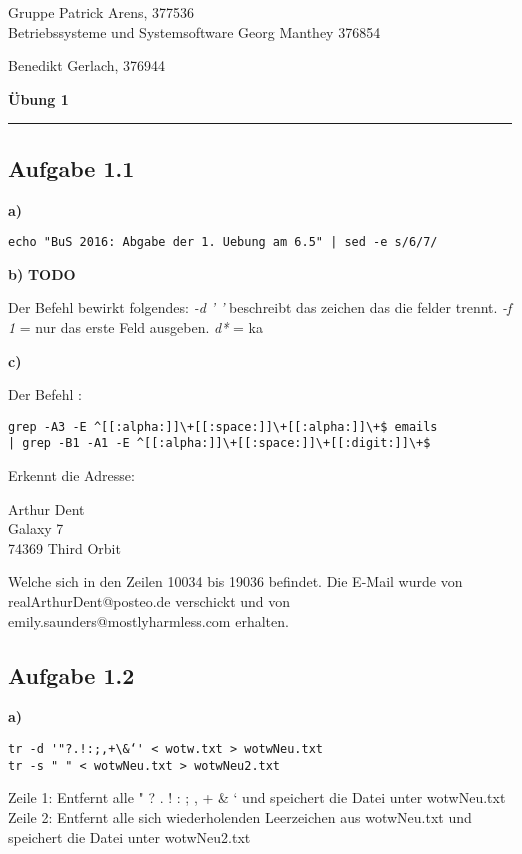 \documentclass[a4paper,graphics,11pt]{article}
\newcommand{\aufgabe}[1]{\subsection*{Aufgabe #1}}
\begin{document}
\noindent Gruppe              \hfill Patrick Arens, 377536\\
\noindent Betriebssysteme und Systemsoftware    \hfill Georg Manthey 376854\\
\strut\hfill Benedikt Gerlach, 376944\\
\begin{center}
	\LARGE{\textbf{Übung 1}}
\end{center}
\begin{center}
\rule[0.1ex]{\textwidth}{1pt}
\end{center}

\aufgabe{1.1}
\textbf{a)}

\begin{verbatim}
echo "BuS 2016: Abgabe der 1. Uebung am 6.5" | sed -e s/6/7/
\end{verbatim}

\textbf{b)}
\textbf{TODO}

Der Befehl bewirkt folgendes: \textit{-d ’ ’} beschreibt das zeichen das die felder trennt. \textit{-f 1} = nur das erste Feld ausgeben. \textit{d*} = ka

\textbf{c)}

Der Befehl :

\begin{verbatim}
grep -A3 -E ^[[:alpha:]]\+[[:space:]]\+[[:alpha:]]\+$ emails 
| grep -B1 -A1 -E ^[[:alpha:]]\+[[:space:]]\+[[:digit:]]\+$
\end{verbatim}



Erkennt die Adresse:

Arthur Dent\\
Galaxy 7\\
74369 Third Orbit

Welche sich in den Zeilen 10034 bis 19036 befindet. Die E-Mail wurde von realArthurDent@posteo.de verschickt und von emily.saunders@mostlyharmless.com erhalten.\\

\aufgabe{1.2}
\textbf{a)}

\begin{verbatim}
tr -d '"?.!:;,+\&‘' < wotw.txt > wotwNeu.txt
tr -s " " < wotwNeu.txt > wotwNeu2.txt
\end{verbatim}

Zeile 1: Entfernt alle " ? . ! : ; , +  \& ‘  und speichert die Datei unter wotwNeu.txt\\
Zeile 2: Entfernt alle sich wiederholenden Leerzeichen aus wotwNeu.txt und speichert die Datei unter wotwNeu2.txt\\
\end{document}
